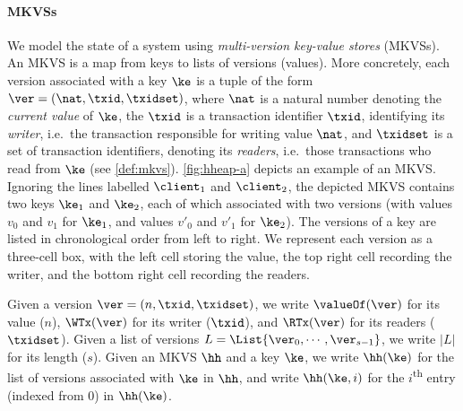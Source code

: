 \paragraph{MKVSs} We model the state of a system using \emph{multi-version key-value stores} (MKVSs). An MKVS is a map from keys to lists of versions (values).
More concretely, each version associated with a key $\ke$ is a tuple of the form \( \ver =( \nat, \txid, \txidset ) \), where  $\nat$ is a natural number denoting the \emph{current value} of $\ke$, 
the $\txid$ is a transaction identifier \( \txid \), identifying its \emph{writer}, i.e.\ the transaction responsible for writing value $\nat$, and 
$\txidset$ is a set of transaction identifiers, denoting its \emph{readers}, i.e.\ those transactions who read from $\ke$ (see \cref{def:mkvs}).
\cref{fig:hheap-a} depicts an example of an MKVS. 
Ignoring the lines labelled $\client_1$ and $\client_2$, the depicted MKVS contains two keys \( \ke_1\) and \( \ke_2 \), each of which associated with two versions (with values $v_0$ and $v_1$ for $\ke_1$, and values $v'_0$ and $v'_1$ for $\ke_2$).
The versions of a key are listed in chronological order from left to right.
We represent each version as a three-cell box, with the left cell storing the value, the top right cell recording the writer, and the bottom right cell recording the readers. 


Given a version $\ver = (n, \txid, \txidset)$, we write $\valueOf(\ver)$ for its value ($n$), $\WTx(\ver)$ for its writer ($\txid$), and $\RTx(\ver)$ for its readers ($\txidset$). 
Given a list of versions $L = \List{\ver_0, \cdots, \ver_{s-1}}$, we write  $\lvert L\rvert$ for its length ($s$). 
Given an MKVS $\hh$ and a key $\ke$, we write $\hh(\ke)$ for the list of versions associated with $\ke$ in $\hh$, and write \(\hh(\ke,i) \) for the $i$\textsuperscript{th} entry (indexed from $0$) in $\hh(\ke)$. 


